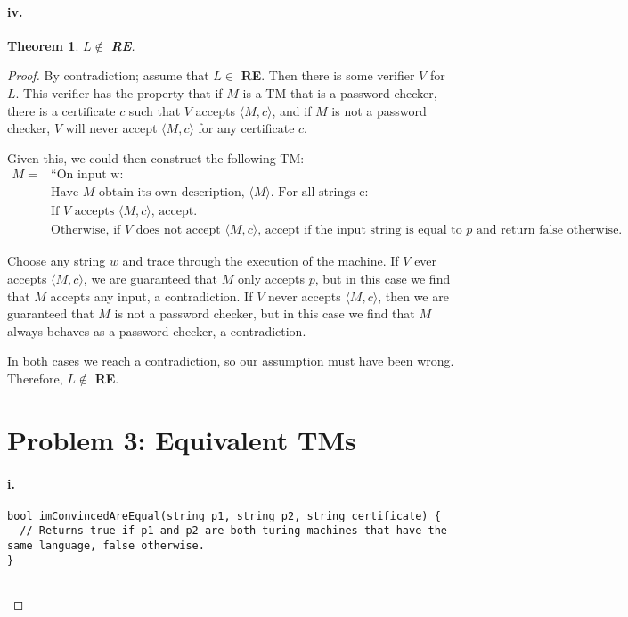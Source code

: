 \documentclass[10pt,letter]{article}
\newtheorem*{thm}{Theorem}
\begin{document}
\paragraph{iv.} \begin{thm} $L \not \in $ \textbf{RE}. \end{thm}
\begin{proof} 

By contradiction; assume that $L \in$ \textbf{RE}. Then there is some verifier $V$ for $L$. This verifier has the property that if $M$ is a TM that is a password checker, there is a certificate $c$ such that $V$ accepts $\langle M, c \rangle$, and if $M$ is not a password checker, $V$ will never accept $\langle M, c \rangle$ for any certificate $c$.

Given this, we could then construct the following TM:
\begin{align*}
M = &\text{“On input w:}\\
&\text{Have $M$ obtain its own description, $\langle M \rangle$. For all strings c:}\\
&\text{If $V$ accepts $\langle M, c \rangle$, accept.}\\
&\text{Otherwise, if $V$ does not accept $\langle M, c \rangle$, accept if the input string is equal to $p$ and return false otherwise.}
\end{align*}

Choose any string $w$ and trace through the execution of the machine. If $V$ ever accepts $\langle M, c \rangle$, we are guaranteed that $M$ only accepts $p$, but in this case we find that $M$ accepts any input, a contradiction. If $V$ never accepts $\langle M, c \rangle$, then we are guaranteed that $M$ is not a password checker, but in this case we find that $M$ always behaves as a password checker, a contradiction.

In both cases we reach a contradiction, so our assumption must have been wrong. Therefore, $L \not \in$ \textbf{RE}.

\section*{Problem 3: Equivalent TMs}

\paragraph{i.} 

\begin{lstlisting}
bool imConvincedAreEqual(string p1, string p2, string certificate) {
  // Returns true if p1 and p2 are both turing machines that have the same language, false otherwise.
}


\end{lstlisting}
\end{proof}
\end{document}

